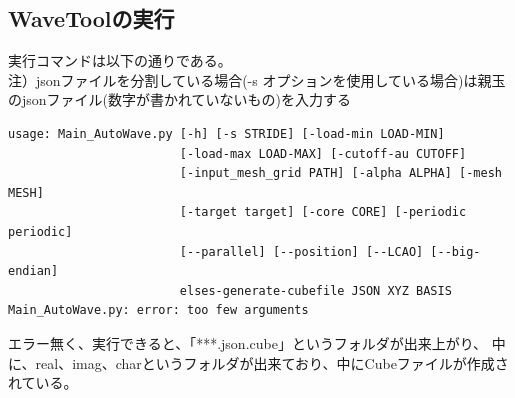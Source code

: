 \documentclass{jsarticle}
\begin{document}
\subsection{WaveToolの実行}

実行コマンドは以下の通りである。\\
注）jsonファイルを分割している場合(-s オプションを使用している場合)は親玉のjsonファイル(数字が書かれていないもの)を入力する\\

\begin{Verbatim}[frame=single]
usage: Main_AutoWave.py [-h] [-s STRIDE] [-load-min LOAD-MIN]
                        [-load-max LOAD-MAX] [-cutoff-au CUTOFF]
                        [-input_mesh_grid PATH] [-alpha ALPHA] [-mesh MESH]
                        [-target target] [-core CORE] [-periodic periodic]
                        [--parallel] [--position] [--LCAO] [--big-endian]
                        elses-generate-cubefile JSON XYZ BASIS
Main_AutoWave.py: error: too few arguments
\end{Verbatim}

エラー無く、実行できると、「***.json.cube」というフォルダが出来上がり、
中に、real、imag、charというフォルダが出来ており、中にCubeファイルが作成されている。\\
\end{document}
